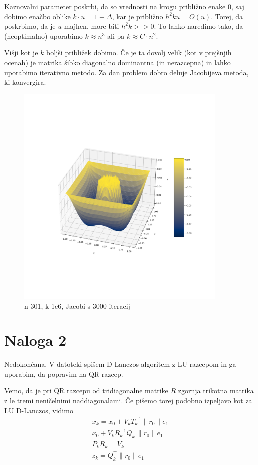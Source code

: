 \documentclass{article}
\begin{document}
    Kaznovalni parameter poskrbi, da so vrednosti na krogu približno enake 0, saj dobimo enačbo oblike \(k\cdot u = 1- \Delta \), kar je približno \(h^2 k u = O(u)\). Torej, da poskrbimo, da je \(u\) majhen, more biti \(h^2k>>0\). To lahko naredimo tako, da (neoptimalno) uporabimo \(k\approx n^3\) ali pa \(k\approx C\cdot n^2\).

    Višji kot je \(k\) boljši približek dobimo. Če je ta dovolj velik (kot v prejšnjih ocenah) je matrika šibko diagonalno dominantna (in nerazcepna) in lahko uporabimo iterativno metodo. Za dan problem dobro deluje Jacobijeva metoda, ki konvergira. 

    \begin{figure}[h]
        \centering
        \includegraphics[width=0.9\textwidth]{nal1_n600_k100000.png}
        \caption{n 301, k 1e6, Jacobi s 3000 iteracij}
    \end{figure}

    
    \section{Naloga 2}
    Nedokončana. V datoteki spišem D-Lanczos algoritem z LU razcepom in ga uporabim, da popravim na QR razcep. 

    Vemo, da je pri QR razcepu od tridiagonalne matrike \(R\) zgornja trikotna matrika z le tremi neničelnimi naddiagonalami. Če pišemo torej podobno izpeljavo kot za LU D-Lanczos, vidimo
    \begin{align*}
        x_k = x_0 + V_kT_k^{-1}\lVert r_0\rVert e_1\\
        x_0 + V_k R_k^{-1} Q_k^\top \lVert r_0 \rVert e_1\\
        P_k R_k= V_k\\
        z_k = Q_k^\top \lVert r_0 \rVert e_1
    \end{align*}
\end{document}
